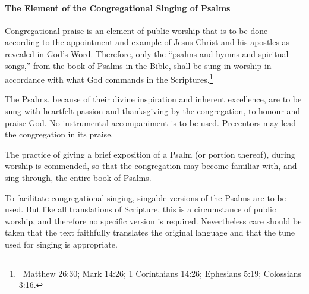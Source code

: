 \begin{outerlst}[left=0pt,labelsep=0pt]
\paragraph[The Element of the Congregational Singing of Psalms]{The Element of the Congregational Singing of Psalms}  

\begin{innerlst}[resume*]
      \item Congregational praise is an element of public worship that is to be done according to the appointment and example of Jesus Christ and his apostles as revealed in God's Word. Therefore, only the ``psalms and hymns and spiritual songs,'' from the book of Psalms in the Bible, shall be sung in worship in accordance with what God commands in the Scriptures.\footnote{\ Matthew 26:30; Mark 14:26; 1 Corinthians 14:26; Ephesians 5:19; Colossians 3:16.}  
      \item The Psalms, because of their divine inspiration and inherent excellence, are to be sung with heartfelt passion and thanksgiving by the congregation, to honour and praise God. No instrumental accompaniment is to be used. Precentors may lead the congregation in its praise. 
      \item The practice of giving a brief exposition of a Psalm (or portion thereof), during worship is commended, so that the congregation may become familiar with, and sing through, the entire book of Psalms. 
      \item To facilitate congregational singing, singable versions of the Psalms are to be used. But like all translations of Scripture, this is a circumstance of public worship, and therefore no specific version is required. Nevertheless care should be taken that the text faithfully translates the original language and that the tune used for singing is appropriate. 
\end{innerlst} 


\end{outerlst}
